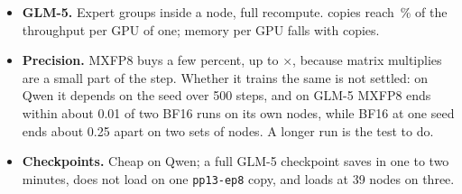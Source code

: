\begin{itemize}[leftmargin=*, itemsep=2pt]
  \item \textbf{GLM-5.} Expert groups inside a node, full recompute. \TriGlmCopiesTop{} copies reach \TriGlmCopiesEff\,\% of the throughput per GPU of one; memory per GPU falls with copies.
  \item \textbf{Precision.} MXFP8 buys a few percent, up to $\times$\TriQwenFpTop, because matrix multiplies are a small part of the step. Whether it trains the same is not settled: on Qwen it depends on the seed over 500 steps, and on GLM-5 MXFP8 ends within about 0.01 of two BF16 runs on its own nodes, while BF16 at one seed ends about 0.25 apart on two sets of nodes. A longer run is the test to do.
  \item \textbf{Checkpoints.} Cheap on Qwen; a full GLM-5 checkpoint saves in one to two minutes, does not load on one \texttt{pp13-ep8} copy, and loads at 39 nodes on three.
\end{itemize}

